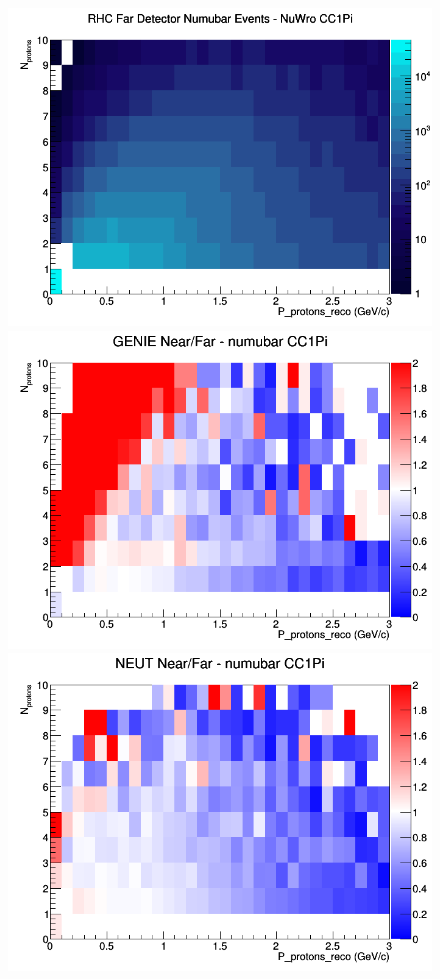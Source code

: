 \begin{figure}[h]
\endminipage
{}
\includegraphics[width=\linewidth]{eff_N_P/GAr/protons/CC1Pi_RHC_FD_numubar_N_P_NuWro.png}
\endminipage
\newline
{}
\includegraphics[width=\linewidth]{eff_N_P/GAr/protons/ratios/CC1Pi_GENIE_numubar_NF_N_P.png}
\endminipage
{}
\includegraphics[width=\linewidth]{eff_N_P/GAr/protons/ratios/CC1Pi_NEUT_numubar_NF_N_P.png}

\end{figure}
